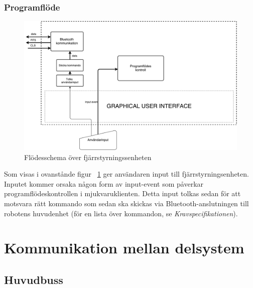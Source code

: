 \documentclass{article}
\begin{document}
\subsubsection{Programflöde}
\begin{figure}[H]
\centering 
\includegraphics[scale=0.4]{Fjarrstyrningsenhet_flowchart2}
\caption{Flödesschema över fjärrstyrningssenheten}
\label{fig:Fjarrstyrningsenhet_flowchart2}
\end{figure}
Som visas i ovanstånde figur ~\ref{fig:Fjarrstyrningsenhet_flowchart2} ger användaren input till fjärrstyrningsenheten. Inputet kommer orsaka någon form av input-event som påverkar programflödeskontrollen i mjukvaruklienten. Detta input tolkas sedan för att motsvara rätt kommando som sedan ska skickas via Bluetooth-anslutningen till robotens huvudenhet (för en lista över kommandon, se \textit{Kravspecifikationen}).

\clearpage

\section{Kommunikation mellan delsystem}

\subsection{Huvudbuss}
\end{document}
